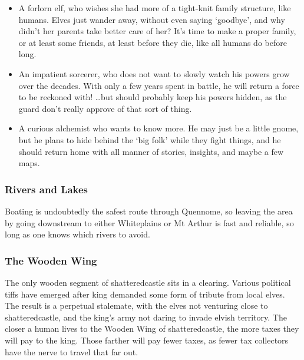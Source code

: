 \begin{multicols}{2}
{\begin{itemize}
    \item
    A forlorn elf, who wishes she had more of a tight-knit family structure, like humans.
    Elves just wander away, without even saying `goodbye', and why didn't her parents take better care of her?
    It's time to make a proper family, or at least some friends, at least before they die, like all humans do before long.
    \item
    An impatient sorcerer, who does not want to slowly watch his powers grow over the decades.
    With only a few years spent in battle, he will return a force to be reckoned with!
    \ldots but should probably keep his powers hidden, as the \gls{guard} don't really approve of that sort of thing.
    \item
    A curious alchemist who wants to know more.
    He may just be a little gnome, but he plans to hide behind the `big folk' while they fight things, and he should return home with all manner of stories, insights, and maybe a few maps.

  \end{itemize}
}{}

\subsubsection{Rivers and Lakes}

Boating is undoubtedly the safest route through Quennome, so leaving the area by going downstream to either Whiteplains or Mt Arthur is fast and reliable, so long as one knows which rivers to avoid.

\subsubsection{The Wooden Wing}

The only wooden segment of \gls{shatteredcastle} sits in a clearing.
Various political tiffs have emerged after \gls{king} demanded some form of tribute from local elves.
The result is a perpetual stalemate, with the elves not venturing close to \gls{shatteredcastle}, and the king's army not daring to invade elvish territory.
The closer a human lives to the Wooden Wing of \gls{shatteredcastle}, the more taxes they will pay to the king.
Those farther will pay fewer taxes, as fewer tax collectors have the nerve to travel that far out.

\iftoggle{players}{}{

\subsubsection{Seasonal Encounters}

}
\end{multicols}
